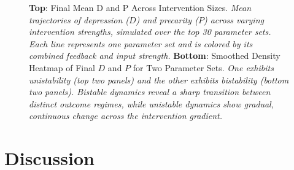 \documentclass[
]{article}
\begin{document}
\begin{figure}


\caption{\label{fig-intervention}\textbf{Top}: Final Mean D and P Across
Intervention Sizes. \emph{Mean trajectories of depression (\(D\)) and
precarity (\(P\)) across varying intervention strengths, simulated over
the top 30 parameter sets. Each line represents one parameter set and is
colored by its combined feedback and input strength.} \textbf{Bottom}:
Smoothed Density Heatmap of Final \(D\) and \(P\) for Two Parameter
Sets. \emph{One exhibits unistability (top two panels) and the other
exhibits bistability (bottom two panels). Bistable dynamics reveal a
sharp transition between distinct outcome regimes, while unistable
dynamics show gradual, continuous change across the intervention
gradient.}}

\end{figure}%

\section{Discussion}\label{discussion}
\end{document}
